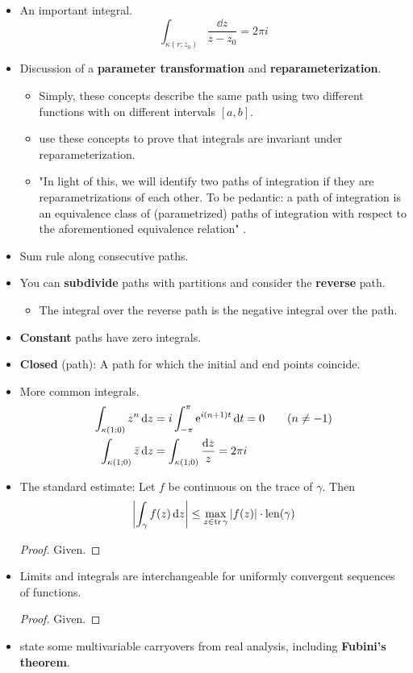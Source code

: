 \documentclass[../notes.tex]{subfiles}
\begin{document}
\begin{itemize}
    \item An important integral.
    \begin{equation*}
        \int_{\kappa(r;z_0)}\frac{\dd{z}}{z-z_0} = 2\pi i
    \end{equation*}
    \item Discussion of a \textbf{parameter transformation} and \textbf{reparameterization}.
    \begin{itemize}
        \item Simply, these concepts describe the same path using two different functions with on different intervals $[a,b]$.
        \item \textcite{bib:FischerLieb} use these concepts to prove that integrals are invariant under reparameterization.
        \item "In light of this, we will identify two paths of integration if they are reparametrizations of each other. To be pedantic: a path of integration is an equivalence class of (parametrized) paths of integration with respect to the aforementioned equivalence relation" \parencite[28]{bib:FischerLieb}.
    \end{itemize}
    \item Sum rule along consecutive paths.
    \item You can \textbf{subdivide} paths with partitions and consider the \textbf{reverse} path.
    \begin{itemize}
        \item The integral over the reverse path is the negative integral over the path.
    \end{itemize}
    \item \textbf{Constant} paths have zero integrals.
    \item \textbf{Closed} (path): A path for which the initial and end points coincide.
    \item More common integrals.
    \begin{align*}
        \int_{\kappa(1;0)}z^n\dd{z} &= i\int_{-\pi}^\pi\e[i(n+1)t]\dd{t} = 0\tag{$n\neq -1$}\\
        \int_{\kappa(1;0)}\bar{z}\dd{z} &= \int_{\kappa(1;0)}\frac{\dd{z}}{z} = 2\pi i
    \end{align*}
    \item The standard estimate: Let $f$ be continuous on the trace of $\gamma$. Then
    \begin{equation*}
        \left| \int_\gamma f(z)\dd{z} \right| \leq \max_{z\in\tr\gamma}|f(z)|\cdot\len(\gamma)
    \end{equation*}
    \begin{proof}
        Given.
    \end{proof}
    \item Limits and integrals are interchangeable for uniformly convergent sequences of functions.
    \begin{proof}
        Given.
    \end{proof}
    \item \textcite{bib:FischerLieb} state some multivariable carryovers from real analysis, including \textbf{Fubini's theorem}.
\end{itemize}
\end{document}
